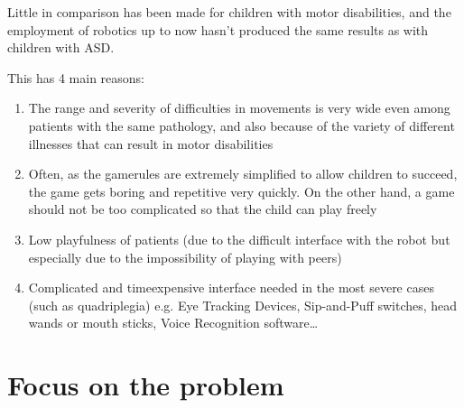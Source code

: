 \documentclass[a4paper,twoside]{book}
\begin{document}
Little in comparison has been made for children with motor disabilities, and the employment of robotics up to now hasn't produced the same results as with children with ASD.

\beforelist This has 4 main reasons:
\begin{enumerate}
\item The range and severity of difficulties in movements is very wide even among patients with the same pathology, and also because of the variety of different illnesses that can result in motor disabilities
\item Often, as the game\textendash rules are extremely simplified to allow children to succeed, the game gets boring and repetitive very quickly. On the other hand, a game should not be too complicated so that the child can play freely
\item Low playfulness of patients (due to the difficult interface with the robot but especially due to the impossibility of playing with peers)
\item Complicated and time\textendash expensive interface needed in the most severe cases (such as quadriplegia) e.g. Eye Tracking Devices, Sip-and-Puff switches, head wands or mouth sticks, Voice Recognition software\ldots
\end{enumerate}
\afterlist*

\section{Focus on the problem}
\end{document}
